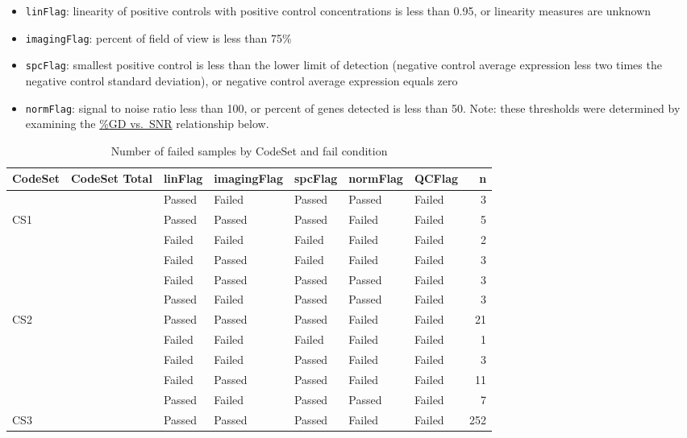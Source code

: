 \documentclass[
]{report}
\providecommand{\tightlist}{%
  \setlength{\itemsep}{0pt}\setlength{\parskip}{0pt}}
\begin{document}
\begin{itemize}
\tightlist
\item
  \texttt{linFlag}: linearity of positive controls with positive control concentrations is less than 0.95, or linearity measures are unknown
\item
  \texttt{imagingFlag}: percent of field of view is less than 75\%
\item
  \texttt{spcFlag}: smallest positive control is less than the lower limit of detection (negative control average expression less two times the negative control standard deviation), or negative control average expression equals zero
\item
  \texttt{normFlag}: signal to noise ratio less than 100, or percent of genes detected is less than 50. Note: these thresholds were determined by examining the \hyperref[gd-vs.-snr]{\%GD vs.~SNR} relationship below.
\end{itemize}

\begin{table}

\caption{\label{tab:qc-failed}Number of failed samples by CodeSet and fail condition}
\centering
\begin{tabular}[t]{l|r|l|l|l|l|l|r}
\hline
CodeSet & CodeSet Total & linFlag & imagingFlag & spcFlag & normFlag & QCFlag & n\\
\hline
 &  & Passed & Failed & Passed & Passed & Failed & 3\\
\cline{3-8}
\multirow{-2}{*}{\raggedright\arraybackslash CS1} & \multirow{-2}{*}{\raggedleft\arraybackslash 8} & Passed & Passed & Passed & Failed & Failed & 5\\
\cline{1-8}
 &  & Failed & Failed & Failed & Failed & Failed & 2\\
\cline{3-8}
 &  & Failed & Passed & Failed & Failed & Failed & 3\\
\cline{3-8}
 &  & Failed & Passed & Passed & Passed & Failed & 3\\
\cline{3-8}
 &  & Passed & Failed & Passed & Passed & Failed & 3\\
\cline{3-8}
\multirow{-5}{*}{\raggedright\arraybackslash CS2} & \multirow{-5}{*}{\raggedleft\arraybackslash 32} & Passed & Passed & Passed & Failed & Failed & 21\\
\cline{1-8}
 &  & Failed & Failed & Failed & Failed & Failed & 1\\
\cline{3-8}
 &  & Failed & Failed & Passed & Failed & Failed & 3\\
\cline{3-8}
 &  & Failed & Passed & Passed & Failed & Failed & 11\\
\cline{3-8}
 &  & Passed & Failed & Passed & Passed & Failed & 7\\
\cline{3-8}
\multirow{-5}{*}{\raggedright\arraybackslash CS3} & \multirow{-5}{*}{\raggedleft\arraybackslash 274} & Passed & Passed & Passed & Failed & Failed & 252\\
\hline
\end{tabular}
\end{table}
\end{document}
